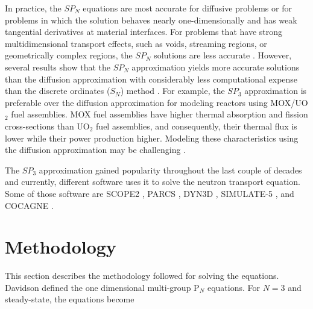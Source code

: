 \documentclass{anstrans}
\begin{document}
In practice, the $SP_N$ equations are most accurate for diffusive problems or for problems in which the solution behaves nearly one-dimensionally and has weak tangential derivatives at material interfaces.
For problems that have strong multidimensional transport effects, such as voids, streaming regions, or geometrically complex regions, the $SP_N$ solutions are less accurate \cite{downar_parcs_2004}.
However, several results show that the $SP_N$ approximation yields more accurate solutions than the diffusion approximation \cite{mui_modified_1987} \cite{beckert_development_2007} \cite{fliscounakis_potential_2012} \cite{ryu_finite_2013} \cite{khosravi_mirzaee_reactor_2019} with considerably less computational expense than the discrete ordinates ($S_N$) method \cite{brantley_simplifiedP3_2000}.
For example, the $SP_3$ approximation is preferable over the diffusion approximation for modeling reactors using MOX/UO$_2$ fuel assemblies.
MOX fuel assemblies have higher thermal absorption and fission cross-sections than UO$_2$ fuel assemblies, and consequently, their thermal flux is lower while their power production higher.
Modeling these characteristics using the diffusion approximation may be challenging \cite{brantley_simplifiedP3_2000} \cite{capilla_applications_2009}.

The $SP_3$ approximation gained popularity throughout the last couple of decades and currently, different software uses it to solve the neutron transport equation. Some of those software are SCOPE2 \cite{tatsumi_object-oriented_2002}, PARCS \cite{downar_parcs_2004}, DYN3D \cite{beckert_development_2007}, SIMULATE-5 \cite{bahadir_studsviks_2009}, and COCAGNE \cite{fliscounakis_potential_2012}.


\section{Methodology}

This section describes the methodology followed for solving the equations.
Davidson \cite{davidson_neutron_1957} defined the one dimensional multi-group P$_N$ equations.
For $N=3$ and steady-state, the equations become
\end{document}
